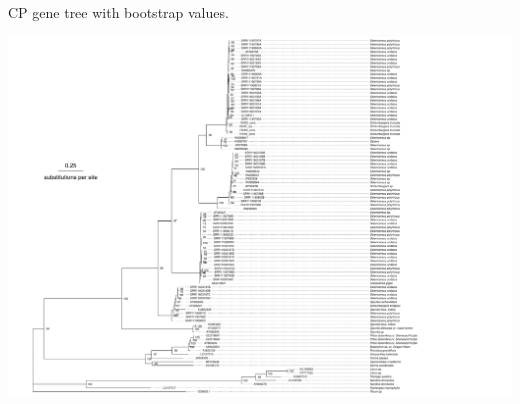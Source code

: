 \documentclass[11pt]{article}
\begin{document}
\begin{suppfigure}
\centering
\caption{
CP gene tree with bootstrap values.
}
\includegraphics[width=1.3\textwidth]{supplementaryinfo/cp_tr.pdf}
\label{fig:genetree5}
\end{suppfigure}
\clearpage


%
%
\end{document}
